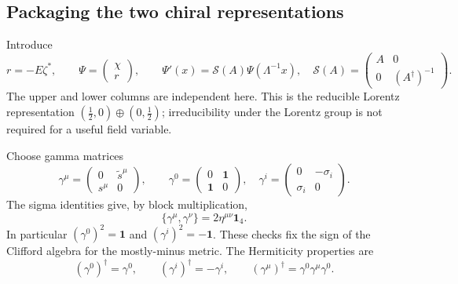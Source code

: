 \documentclass[11pt]{article}
\newcommand{\one}{\mathbf 1}
\begin{document}
\subsection{Packaging the two chiral representations}
Introduce
\begin{equation}
 r=-E\zeta^*,\qquad
 \Psi=\begin{pmatrix}\chi\\r\end{pmatrix},\qquad
 \Psi'(x)=\mathcal S(A)\Psi(\Lambda^{-1}x),\quad
 \mathcal S(A)=\begin{pmatrix}A&0\\0&(A^\dagger)^{-1}\end{pmatrix}.
 \label{eq:diracpack}
\end{equation}
The upper and lower columns are independent here. This is the
reducible Lorentz representation
\((\tfrac12,0)\oplus(0,\tfrac12)\); irreducibility under the Lorentz
group is not required for a useful field variable.

Choose gamma matrices
\begin{equation}
 \gamma^\mu=\begin{pmatrix}0&\widetilde s^\mu\\s^\mu&0\end{pmatrix},
 \qquad
 \gamma^0=\begin{pmatrix}0&\one\\\one&0\end{pmatrix},\quad
 \gamma^i=\begin{pmatrix}0&-\sigma_i\\\sigma_i&0\end{pmatrix}.
 \label{eq:gamma}
\end{equation}
The sigma identities give, by block multiplication,
\begin{equation}
 \boxed{\{\gamma^\mu,\gamma^\nu\}=2\eta^{\mu\nu}\one_4.}
 \label{eq:clifford}
\end{equation}
In particular \((\gamma^0)^2=\one\) and
\((\gamma^i)^2=-\one\). These checks fix the sign of the Clifford
algebra for the mostly-minus metric. The Hermiticity properties are
\begin{equation}
 (\gamma^0)^\dagger=\gamma^0,\qquad
 (\gamma^i)^\dagger=-\gamma^i,\qquad
 (\gamma^\mu)^\dagger=\gamma^0\gamma^\mu\gamma^0.
 \label{eq:gammaherm}
\end{equation}
\end{document}
